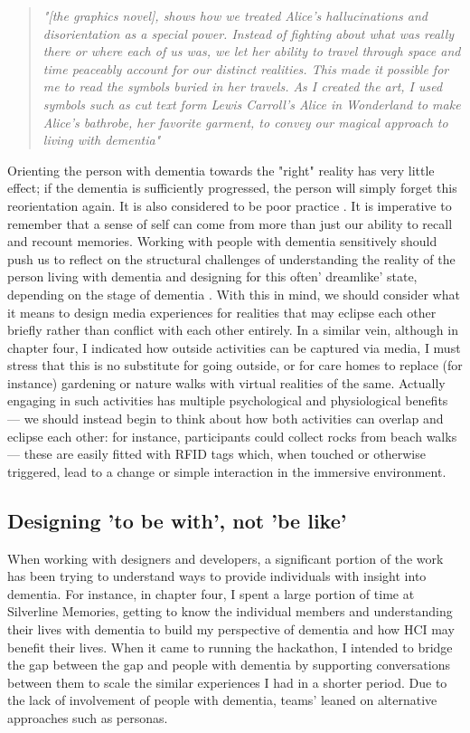 \begin{quote}
\textit{"[the graphics novel], shows how we treated Alice's hallucinations and disorientation as a special power. Instead of fighting about what was really there or where each of us was, we let her ability to travel through space and time peaceably account for our distinct realities. This made it possible for me to read the symbols buried in her travels. As I created the art, I used symbols such as cut text form Lewis Carroll's Alice in Wonderland to make Alice's bathrobe, her favorite garment, to convey our magical approach to living with dementia" \citep{walrath2021aliceheimer,walrath2017end}}
\end{quote}
Orienting the person with dementia towards the "right" reality has very little effect; if the dementia is sufficiently progressed, the person will simply forget this reorientation again. It is also considered to be poor practice \citep{cipriani_understanding_2014}. It is imperative to remember that a sense of self can come from more than just our ability to recall and recount memories. Working with people with dementia sensitively should push us to reflect on the structural challenges of understanding the reality of the person living with dementia and designing for this often' dreamlike' state, depending on the stage of dementia \citep{bryden_before_2015}. With this in mind, we should consider what it means to design media experiences for realities that may eclipse each other briefly rather than conflict with each other entirely. In a similar vein,  although in chapter four, I indicated how outside activities can be captured via media, I must stress that this is no substitute for going outside, or for care homes to replace (for instance) gardening or nature walks with virtual realities of the same. Actually engaging in such activities has multiple psychological and physiological benefits \citep{gilliard_transforming_2011} — we should instead begin to think about how both activities can overlap and eclipse each other: for instance, participants could collect rocks from beach walks — these are easily fitted with RFID tags which, when touched or otherwise triggered, lead to a change or simple interaction in the immersive environment.

\subsection{Designing 'to be with', not 'be like'}
\label{sec:considerationbeWith}
When working with designers and developers, a significant portion of the work has been trying to understand ways to provide individuals with insight into dementia. For instance, in chapter four, I spent a large portion of time at Silverline Memories, getting to know the individual members and understanding their lives with dementia to build my perspective of dementia and how HCI may benefit their lives. When it came to running the hackathon, I intended to bridge the gap between the gap and people with dementia by supporting conversations between them to scale the similar experiences I had in a shorter period. Due to the lack of involvement of people with dementia, teams' leaned on alternative approaches such as personas. 

